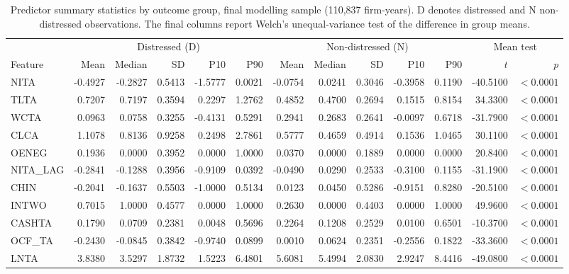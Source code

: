 \begin{landscape}
\begin{table}[p]
\centering
\caption[Predictor summary statistics by outcome group]{Predictor summary statistics by outcome group, final modelling sample (110,837 firm-years). D denotes distressed and N non-distressed observations. The final columns report Welch's unequal-variance test of the difference in group means.}
\label{tab:predictor_stats}
\scriptsize
\setlength{\tabcolsep}{2.4pt}
\begin{tabular}{lrrrrrrrrrrrr}
\toprule
& \multicolumn{5}{c}{Distressed (D)} & \multicolumn{5}{c}{Non-distressed (N)} & \multicolumn{2}{c}{Mean test} \\
\cmidrule(lr){2-6}\cmidrule(lr){7-11}\cmidrule(lr){12-13}
Feature & Mean & Median & SD & P10 & P90 & Mean & Median & SD & P10 & P90 & $t$ & $p$ \\
\midrule
NITA & -0.4927 & -0.2827 & 0.5413 & -1.5777 & 0.0021 & -0.0754 & 0.0241 & 0.3046 & -0.3958 & 0.1190 & -40.5100 & $<0.0001$ \\
TLTA & 0.7207 & 0.7197 & 0.3594 & 0.2297 & 1.2762 & 0.4852 & 0.4700 & 0.2694 & 0.1515 & 0.8154 & 34.3300 & $<0.0001$ \\
WCTA & 0.0963 & 0.0758 & 0.3255 & -0.4131 & 0.5291 & 0.2941 & 0.2683 & 0.2641 & -0.0097 & 0.6718 & -31.7900 & $<0.0001$ \\
CLCA & 1.1078 & 0.8136 & 0.9258 & 0.2498 & 2.7861 & 0.5777 & 0.4659 & 0.4914 & 0.1536 & 1.0465 & 30.1100 & $<0.0001$ \\
OENEG & 0.1936 & 0.0000 & 0.3952 & 0.0000 & 1.0000 & 0.0370 & 0.0000 & 0.1889 & 0.0000 & 0.0000 & 20.8400 & $<0.0001$ \\
NITA\_LAG & -0.2841 & -0.1288 & 0.3956 & -0.9109 & 0.0392 & -0.0490 & 0.0290 & 0.2533 & -0.3100 & 0.1155 & -31.1900 & $<0.0001$ \\
CHIN & -0.2041 & -0.1637 & 0.5503 & -1.0000 & 0.5134 & 0.0123 & 0.0450 & 0.5286 & -0.9151 & 0.8280 & -20.5100 & $<0.0001$ \\
INTWO & 0.7015 & 1.0000 & 0.4577 & 0.0000 & 1.0000 & 0.2630 & 0.0000 & 0.4403 & 0.0000 & 1.0000 & 49.9600 & $<0.0001$ \\
CASHTA & 0.1790 & 0.0709 & 0.2381 & 0.0048 & 0.5696 & 0.2264 & 0.1208 & 0.2529 & 0.0100 & 0.6501 & -10.3700 & $<0.0001$ \\
OCF\_TA & -0.2430 & -0.0845 & 0.3842 & -0.9740 & 0.0899 & 0.0010 & 0.0624 & 0.2351 & -0.2556 & 0.1822 & -33.3600 & $<0.0001$ \\
LNTA & 3.8380 & 3.5297 & 1.8732 & 1.5223 & 6.4801 & 5.6081 & 5.4994 & 2.0830 & 2.9247 & 8.4416 & -49.0800 & $<0.0001$ \\

\end{tabular}
\end{table}
\end{landscape}
